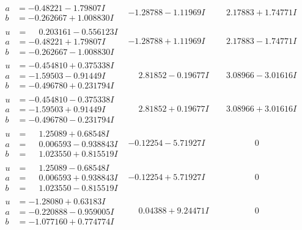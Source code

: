 \documentclass[1p]{elsarticle_modified}
\theoremstyle{definition}
\begin{document}
$$\begin{array}{c|c|c}
\begin{aligned}
a &= -0.48221 - 1.79807 I \\
b &= -0.262667 + 1.008830 I\end{aligned}
 & -1.28788 - 1.11969 I & \phantom{-}2.17883 + 1.74771 I \\ \hline\begin{aligned}
u &= \phantom{-}0.203161 - 0.556123 I \\
a &= -0.48221 + 1.79807 I \\
b &= -0.262667 - 1.008830 I\end{aligned}
 & -1.28788 + 1.11969 I & \phantom{-}2.17883 - 1.74771 I \\ \hline\begin{aligned}
u &= -0.454810 + 0.375338 I \\
a &= -1.59503 - 0.91449 I \\
b &= -0.496780 + 0.231794 I\end{aligned}
 & \phantom{-}2.81852 - 0.19677 I & \phantom{-}3.08966 - 3.01616 I \\ \hline\begin{aligned}
u &= -0.454810 - 0.375338 I \\
a &= -1.59503 + 0.91449 I \\
b &= -0.496780 - 0.231794 I\end{aligned}
 & \phantom{-}2.81852 + 0.19677 I & \phantom{-}3.08966 + 3.01616 I \\ \hline\begin{aligned}
u &= \phantom{-}1.25089 + 0.68548 I \\
a &= \phantom{-}0.006593 - 0.938843 I \\
b &= \phantom{-}1.023550 + 0.815519 I\end{aligned}
 & -0.12254 - 5.71927 I & \phantom{-0.000000 } 0 \\ \hline\begin{aligned}
u &= \phantom{-}1.25089 - 0.68548 I \\
a &= \phantom{-}0.006593 + 0.938843 I \\
b &= \phantom{-}1.023550 - 0.815519 I\end{aligned}
 & -0.12254 + 5.71927 I & \phantom{-0.000000 } 0 \\ \hline\begin{aligned}
u &= -1.28080 + 0.63183 I \\
a &= -0.220888 - 0.959005 I \\
b &= -1.077160 + 0.774774 I\end{aligned}
 & \phantom{-}0.04388 + 9.24471 I & \phantom{-0.000000 } 0 \\ \hline\begin{aligned}

\end{aligned}
\end{array}$$
\end{document}
